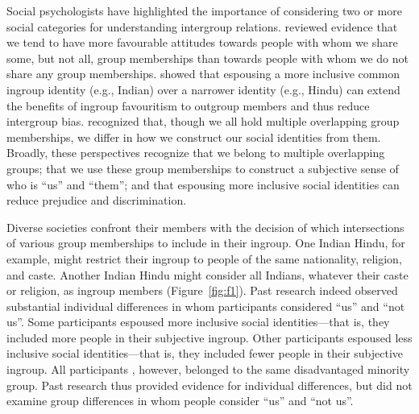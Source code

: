 \documentclass[12pt, a4paper]{article}
\begin{document}
Social psychologists have highlighted the importance of considering two \parencite{berry_immigration_1997, crisp_multiple_2007, dovidio_commonality_2009} or more \parencite{roccas_social_2002} social categories for understanding intergroup relations. \textcite{crisp_multiple_2007} reviewed evidence that we tend to have more favourable attitudes towards people with whom we share some, but not all, group memberships than towards people with whom we do not share any group memberships. \textcite{gaertner_reducing_2000} showed that espousing a more inclusive common ingroup identity (e.g., Indian) over a narrower identity (e.g., Hindu) can extend the benefits of ingroup favouritism to outgroup members and thus reduce intergroup bias. \textcite{roccas_social_2002} recognized that, though we all hold multiple overlapping group memberships, we differ in how we construct our social identities from them. Broadly, these perspectives recognize that we belong to multiple overlapping groups; that we use these group memberships to construct a subjective sense of who is “us” and “them”; and that espousing more inclusive social identities can reduce prejudice and discrimination.

Diverse societies confront their members with the decision of which intersections of various group memberships to include in their ingroup. One Indian Hindu, for example, might restrict their ingroup to people of the same nationality, religion, and caste. Another Indian Hindu might consider all Indians, whatever their caste or religion, as ingroup members (Figure~\ref{fig:f1}). Past research \parencite{van_dommelen_construing_2015} indeed observed substantial individual differences in whom participants considered “us” and “not us”. Some participants espoused more inclusive social identities---that is, they included more people in their subjective ingroup. Other participants espoused less inclusive social identities---that is, they included fewer people in their subjective ingroup. All participants \parencite[studied by][]{van_dommelen_construing_2015}, however, belonged to the same disadvantaged minority group. Past research thus provided evidence for individual differences, but did not examine group differences in whom people consider “us” and “not us”.
\end{document}
